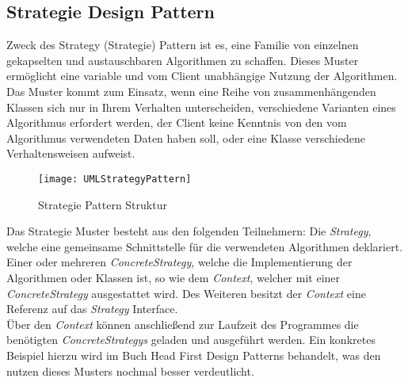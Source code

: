 \subsection{Strategie Design Pattern}\label{sec:StrategyPattern}
Zweck des Strategy (Strategie) Pattern ist es, eine Familie von einzelnen gekapselten und austauschbaren Algorithmen zu schaffen. Dieses Muster ermöglicht eine variable und vom Client unabhängige Nutzung der Algorithmen.\cite[S.381 ff]{DesignPatterns}\\
Das Muster kommt zum Einsatz, wenn eine Reihe von zusammenhängenden Klassen sich nur in Ihrem Verhalten unterscheiden, verschiedene Varianten eines Algorithmus erfordert werden, der Client keine Kenntnis von den vom Algorithmus verwendeten Daten haben soll, oder eine Klasse verschiedene Verhaltensweisen aufweist.\cite[S.383 ff]{DesignPatterns}\\
\vspace{-0.5cm}
\begin{center}
    \begin{figure}[h]
     \centering
     \texttt{[image: UMLStrategyPattern]}
     \caption{Strategie Pattern Struktur \cite{DesignPatterns}}
    \label{fig:StrategyPattern}
    \end{figure}
\end{center}
\vspace{-2cm}
Das Strategie Muster besteht aus den folgenden Teilnehmern: Die \textit{Strategy}, welche eine gemeinsame Schnittstelle für die verwendeten Algorithmen deklariert. Einer oder mehreren \textit{ConcreteStrategy}, welche die Implementierung der Algorithmen oder Klassen ist, so wie dem \textit{Context}, welcher mit einer \textit{ConcreteStrategy} ausgestattet wird. Des Weiteren besitzt der \textit{Context} eine Referenz auf das \textit{Strategy} Interface.\cite[S.383 ff]{DesignPatterns}\\
Über den \textit{Context} können anschließend zur Laufzeit des Programmes die benötigten \textit{ConcreteStrategys} geladen und ausgeführt werden. 
Ein konkretes Beispiel hierzu wird im Buch Head First Design Patterns \cite{HeadfirstDesignPatterns} behandelt, was den nutzen dieses Musters nochmal besser verdeutlicht.